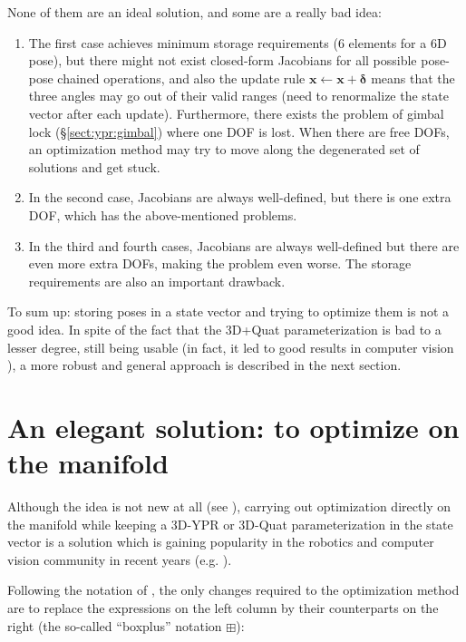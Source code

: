 \documentclass[a4paper,11pt]{report}
\newcommand{\DEL}{{\bm{\delta}}}
\begin{document}
None of them are an ideal solution, and some are a really bad idea:

\begin{enumerate}
 \item The first case achieves minimum storage requirements (6 elements for a 6D pose),
but there might not exist closed-form Jacobians for all possible pose-pose chained operations,
and also the update rule $\mathbf{x}  \leftarrow \mathbf{x} + \DEL$ means that the three
angles may go out of their valid ranges (need to renormalize the state vector after each update).
Furthermore, there exists the problem of gimbal lock (\S \ref{sect:ypr:gimbal}) where one
DOF is lost. When there are free DOFs, an optimization method may try to move along the
degenerated set of solutions and get stuck.

\item In the second case, Jacobians are always well-defined, but there is one extra DOF, which has
the above-mentioned problems.

\item In the third and fourth cases, Jacobians are always well-defined but there are
even more extra DOFs, making the problem even worse. The storage requirements are also an
important drawback.
\end{enumerate}

To sum up: storing poses in a state vector and trying to optimize
them is not a good idea.
In spite of the fact that
the 3D+Quat parameterization is bad to a lesser degree,
still being usable
(in fact, it led to good results in computer vision \cite{davison2007mrt}),
a more robust and general approach is described in the next section.


\section{An elegant solution: to optimize on the manifold}
\label{sect:opti_manif}

Although the idea is not new at all (see \cite{gabay1982mdf}),
carrying out optimization directly on the manifold while
keeping a 3D-YPR or 3D-Quat parameterization in the
state vector is a solution which is gaining popularity
in the robotics and computer vision community in recent years
(e.g. \cite{hertzberg2008fsm,strasdat2010scale}).

Following the notation of \cite{hertzberg2008fsm,hertzberg2013integrating}, the only changes required
to the optimization method are
to replace the expressions on the left column by their counterparts on the right (the so-called ``boxplus'' notation $\boxplus$):
\end{document}
